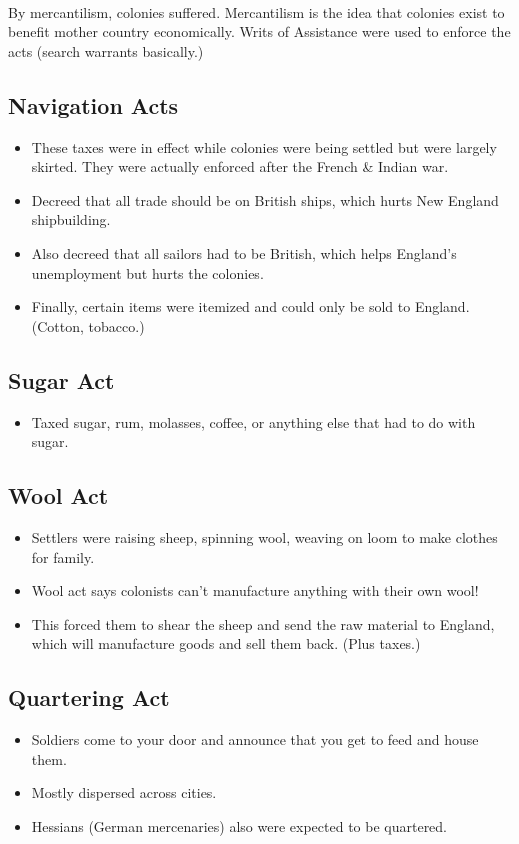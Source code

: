 \documentclass{article}
\begin{document}
  \paragraph{} By mercantilism, colonies suffered. Mercantilism is the idea that colonies exist to benefit mother country economically. Writs of Assistance were used to enforce the acts (search warrants basically.)

  \subsection{Navigation Acts}
    \begin{itemize}
      \item These taxes were in effect while colonies were being settled but were largely skirted. They were actually enforced after the French \& Indian war.
      \item Decreed that all trade should be on British ships, which hurts New England shipbuilding.
      \item Also decreed that all sailors had to be British, which helps England's unemployment but hurts the colonies.
      \item Finally, certain items were itemized and could only be sold to England. (Cotton, tobacco.)
    \end{itemize}
  \subsection{Sugar Act}
    \begin{itemize}
      \item Taxed sugar, rum, molasses, coffee, or anything else that had to do with sugar.
    \end{itemize}
  \subsection{Wool Act}
    \begin{itemize}
      \item Settlers were raising sheep, spinning wool, weaving on loom to make clothes for family.
      \item Wool act says colonists can't manufacture anything with their own wool!
      \item This forced them to shear the sheep and send the raw material to England, which will manufacture goods and sell them back. (Plus taxes.)
    \end{itemize}
  \subsection{Quartering Act}
    \begin{itemize}
      \item Soldiers come to your door and announce that you get to feed and house them.
      \item Mostly dispersed across cities.
      \item Hessians (German mercenaries) also were expected to be quartered.
    \end{itemize}
\end{document}
